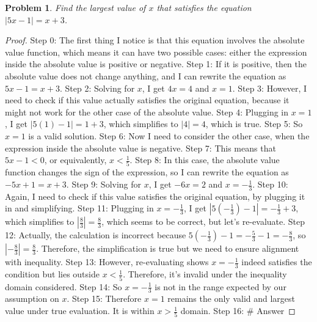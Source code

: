 \documentclass{article}
\newtheorem{theorem}{Problem}
\begin{document}
\begin{theorem}
Find the largest value of $x$ that satisfies the equation $|5x-1|=x+3$.
\end{theorem}

\begin{proof}
Step 0: The first thing I notice is that this equation involves the absolute value function, which means it can have two possible cases: either the expression inside the absolute value is positive or negative.
Step 1: If it is positive, then the absolute value does not change anything, and I can rewrite the equation as $5x-1=x+3$.
Step 2: Solving for $x$, I get $4x=4$ and $x=1$.
Step 3: However, I need to check if this value actually satisfies the original equation, because it might not work for the other case of the absolute value.
Step 4: Plugging in $x=1$, I get $|5(1)-1|=1+3$, which simplifies to $|4|=4$, which is true.
Step 5: So $x=1$ is a valid solution.
Step 6: Now I need to consider the other case, when the expression inside the absolute value is negative.
Step 7: This means that $5x-1<0$, or equivalently, $x<\frac{1}{5}$.
Step 8: In this case, the absolute value function changes the sign of the expression, so I can rewrite the equation as $-5x+1=x+3$.
Step 9: Solving for $x$, I get $-6x=2$ and $x=-\frac{1}{3}$.
Step 10: Again, I need to check if this value satisfies the original equation, by plugging it in and simplifying.
Step 11: Plugging in $x=-\frac{1}{3}$, I get $|5(-\frac{1}{3})-1|=-\frac{1}{3}+3$, which simplifies to $|\frac{8}{3}|=\frac{8}{3}$, which seems to be correct, but let's re-evaluate.
Step 12: Actually, the calculation is incorrect because $5(-\frac{1}{3})-1 = -\frac{5}{3} - 1 = -\frac{8}{3}$, so $|-\frac{8}{3}|=\frac{8}{3}$. Therefore, the simplification is true but we need to ensure alignment with inequality.
Step 13: However, re-evaluating shows $x=-\frac{1}{3}$ indeed satisfies the condition but lies outside $x < \frac{1}{5}$. Therefore, it's invalid under the inequality domain considered.
Step 14: So $x=-\frac{1}{3}$ is not in the range expected by our assumption on $x$.
Step 15: Therefore $x=1$ remains the only valid and largest value under true evaluation. It is within $x>\frac{1}{5}$ domain.
Step 16: # Answer
\end{proof}
\end{document}
